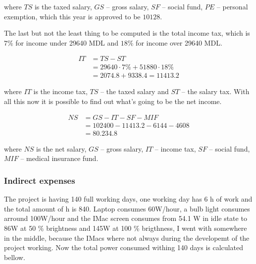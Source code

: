 \noindent
where $TS$ is the taxed salary, $GS$ -- gross salary, $SF$ -- social fund, $PE$ -- personal exemption, which this year is approved to be $10128$.

The last but not the least thing to be computed is the total income tax, which is $7\%$ for income under 29640 MDL and $18\%$ for income over 29640 MDL.

\begin{equation}
\begin{split}
 IT &= TS - ST \\
      &= 29640 \cdot 7\% + 51880 \cdot 18\% \\
      & = 2074.8 + 9338.4 = 11413.2
 \end{split}
\end{equation}

\noindent
where $IT$ is the income tax, $TS$ -- the taxed salary and $ST$ -- the salary tax. With all this now it is possible to find out what's going to be the net income.

\begin{equation}
\begin{split}
 NS &= GS - IT - SF - MIF \\
            &= 102400 - 11413.2 - 6144 - 4608 \\
            &= 80.234.8
\end{split}
\end{equation}

\noindent
where $NS$ is the net salary, $GS$ -- gross salary, $IT$ -- income tax, $SF$ -- social fund, $MIF$ -- medical insurance fund.

\subsubsection{Indirect expenses}

The project is having 140 full working days, one working day has 6 h of work and the total amount of h is 840.
Laptop consumes 60W/hour, a bulb light consumes arround 100W/hour and the IMac screen consumes from 54.1 W in idle state to 86W at 50 \% brightness and 145W at 100 \% brigthness, I went with somewhere in the middle, because the IMacs where not always during the developemt of the project working. Now the total power consumed withing 140 days is calculated bellow.

